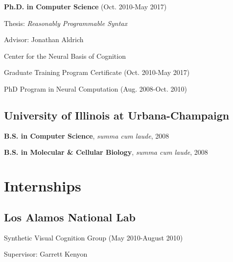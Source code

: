 \documentclass[10pt,letterpaper]{article}
\renewenvironment{itemize}{
  \begin{list}{}{
    \setlength{\leftmargin}{1.25em}
    \setlength{\itemsep}{0.25em}
    \setlength{\parskip}{0pt}
    \setlength{\parsep}{0.2em}
  }
}{
  \end{list}
}
\begin{document}
\begin{itemize}
  \item \textbf{Ph.D. in Computer Science} (Oct. 2010-May 2017)
        \begin{itemize}
          \item Thesis: \emph{Reasonably Programmable Syntax}
          \item Advisor: Jonathan Aldrich
        \end{itemize}
  \item Center for the Neural Basis of Cognition
        \begin{itemize}
          \item Graduate Training Program Certificate (Oct. 2010-May 2017)
          \item PhD Program in Neural Computation (Aug. 2008-Oct. 2010)
        \end{itemize}
\end{itemize}

\subsection*{University of Illinois at Urbana-Champaign}
\begin{itemize}
  \item \textbf{B.S. in Computer Science}, \emph{summa cum laude}, 2008
  \item \textbf{B.S. in Molecular \& Cellular Biology}, \emph{summa cum laude}, 2008
\end{itemize}


\section*{Internships}
\subsection*{Los Alamos National Lab}
\begin{itemize}
  \item Synthetic Visual Cognition Group (May 2010-August 2010)
  \item Supervisor: Garrett Kenyon
\end{itemize}
\end{document}
